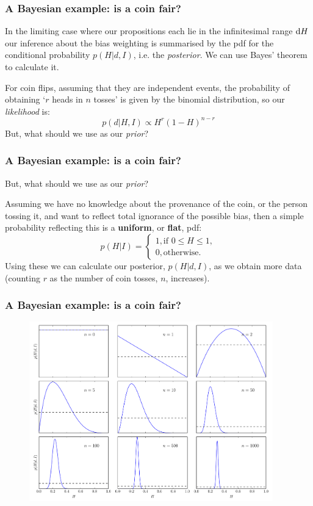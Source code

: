 \begin{frame}

\frametitle{A Bayesian example: is a coin fair?}
\label{abayesianexample:isacoinfair}

In the limiting case where our propositions each lie in the infinitesimal range ${\rm d}H$
our inference about the bias weighting is summarised by the pdf for the conditional probability
$p(H|d,I)$, i.e. the \emph{posterior}. We can use Bayes' theorem to calculate it.

For coin flips, assuming that they are independent events, the probability of obtaining `$r$ heads in
$n$ tosses' is given by the binomial distribution, so our \emph{likelihood} is:
\[
p(d|H,I) \propto H^r(1-H)^{n-r}
\]
But, what should we use as our \emph{prior}?

\end{frame}

\begin{frame}

\frametitle{A Bayesian example: is a coin fair?}
\label{abayesianexample:isacoinfair}

But, what should we use as our \emph{prior}?

Assuming we have no knowledge about the provenance of the coin, or the person tossing it, and want to
reflect total ignorance of the possible bias, then a simple probability reflecting this is a \textbf{uniform},
or \textbf{flat}, pdf:
\[
p(H|I) =
\begin{cases}
1, \text{if } 0 \le H \le 1, \\
0, \text{otherwise}.
\end{cases}
\]
Using these we can calculate our posterior, $p(H|d,I)$, as we obtain more data (counting $r$ as the
number of coin tosses, $n$, increases).

\end{frame}

\begin{frame}

\frametitle{A Bayesian example: is a coin fair?}
\label{abayesianexample:isacoinfair}

\begin{figure}[htbp]
\centering
\includegraphics[keepaspectratio,width=\textwidth,height=220pt]{figures/coin_toss.pdf}
\label{coin_toss}
\end{figure}

\end{frame}

